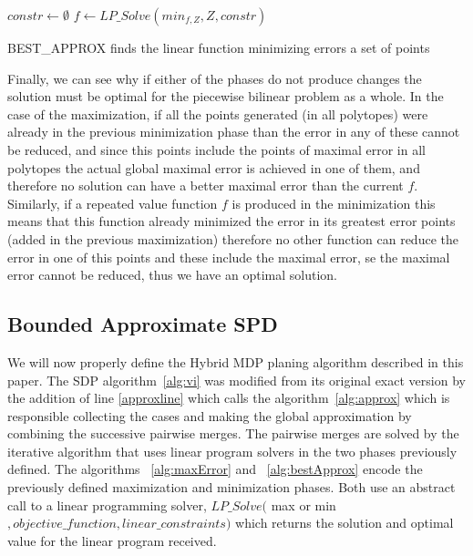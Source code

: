 \begin{algorithm}[!h]
\dontprintsemicolon
{}
$constr \gets \emptyset$\;
\;
$f \gets LP\_Solve(min_{f,Z}, Z, constr)$\;	
\;
\caption{{\sc BEST\_APPROX} finds the linear function minimizing errors a set of points}
\label{alg:bestApprox}
\end{algorithm}


Finally, we can see why if either of the phases do not produce changes the solution must be optimal for the piecewise bilinear problem as a whole. In the case of the maximization, if all the points generated (in all polytopes) were already in the previous minimization phase than the error in any of these cannot be reduced, and since this points include the points of maximal error in all polytopes the actual global maximal error is achieved in one of them, and therefore no solution can have a better maximal error than the current $f$. Similarly, if a repeated value function $f$ is produced in the minimization this means that this function already minimized the error in its greatest error points (added in the previous maximization) therefore no other function can reduce the error in one of this points and these include the maximal error, se the maximal error cannot be reduced, thus we have an optimal solution.

\subsection{Bounded Approximate SPD}
We will now properly define the Hybrid MDP planing algorithm described in this paper. The SDP algorithm~\ref{alg:vi} was modified from its original exact version by the addition of line \ref{approxline} which calls the algorithm~\ref{alg:approx} which is responsible collecting the cases and making the global approximation by combining the successive pairwise merges. The pairwise merges are solved by the iterative algorithm that uses linear program solvers in the two phases previously defined. The algorithms ~\ref{alg:maxError} and ~\ref{alg:bestApprox} encode the previously defined maximization and minimization phases. Both use an abstract call to a linear programming solver, $LP\_Solve($ max or min$, objective\_function, linear\_constraints)$ which returns the solution and optimal value for the linear program received.




